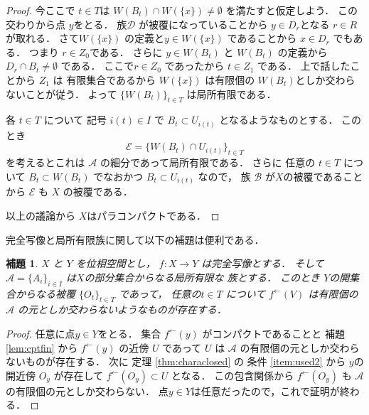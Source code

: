 \documentclass[leqno, a4paper, 12pt]{jsarticle}
\newtheorem{lem}[thm]{補題}
\newcommand{\myinv}[1]{#1^{\gets}}
\begin{document}
\begin{proof}
今ここで
$t\in T$は
$W(B_{t})\cap W(\{x\})\neq \emptyset$
を満たすと仮定しよう．
この交わりから点
$y$をとる．
族$\mathcal{D}$
が被覆になっていることから
$y\in D_{r}$となる
$r\in R$
が取れる．
さて$W(\{x\})$
の定義と$y\in W(\{x\})$
であることから
$x\in D_{r}$
でもある．
つまり
$r\in Z_{0}$である．
さらに
$y\in W(B_{t})$
と
$W(B_{t})$
の定義から
$D_{r}\cap B_{t}\neq \emptyset$
である．
ここで$r\in Z_{0}$
であったから
$t\in Z_{1}$
である．
上で話したことから
$Z_{1}$
は
有限集合であるから
$W(\{x\})$
は有限個の
$W(B_{t})$としか交わらないことが従う．
よって
$\{W(B_{t})\}_{t\in T}$
は局所有限である．


各
$t\in T$
について
記号
$i(t)\in I$
で
$B_{t}\subset U_{i(t)}$
となるようなものとする．
このとき
\[
\mathcal{E}=\{W(B_{t})\cap U_{i(t)}\}_{t\in T}
\]
を考えるとこれは
$\mathcal{A}$
の細分であって局所有限である．
さらに
任意の
$t\in T$
について
$B_{t}\subset W(B_{t})$
でなおかつ
$B_{t}\subset U_{i(t)}$
なので，
族
$\mathcal{B}$
が$X$の被覆であることから
$\mathcal{E}$
も
$X$
の被覆である．

以上の議論から
$X$はパラコンパクトである．
\end{proof}


完全写像と局所有限族に関して以下の補題は便利である．
\begin{lem}\label{lem:perfectlocfin}
$X$
と
$Y$
を位相空間とし，
$f\colon X\to Y$
は完全写像とする．
そして
$\mathcal{A}=\{A_{i}\}_{i\in I}$
は$X$の部分集合からなる局所有限な
族とする．
このとき
$Y$の開集合からなる被覆
$\{O_{t}\}_{t\in T}$
であって，
任意の$t\in T$
について
$\myinv{f}(V)$
は有限個の
$\mathcal{A}$
の元としか交わらないようなものが存在する．
\end{lem}
\begin{proof}
任意に点$y\in Y$をとる．
集合
$\myinv{f}(y)$
がコンパクトであることと
補題
\ref{lem:cptfin}
から
$\myinv{f}(y)$
の近傍
$U$
であって
$U$
は
$\mathcal{A}$
の有限個の元としか交わらないものが存在する．
次に
定理
\ref{thm:characlosed}
の
条件
\ref{item:used2}
から
$y$の開近傍
$O_{y}$
が存在して
$\myinv{f}(O_{y})\subset U$
となる．
この包含関係から
$\myinv{f}(O_{y})$
も
$\mathcal{A}$
の有限個の元としか交わらない．
点$y\in Y$は任意だったので，これで証明が終わる．
\end{proof}
\end{document}
